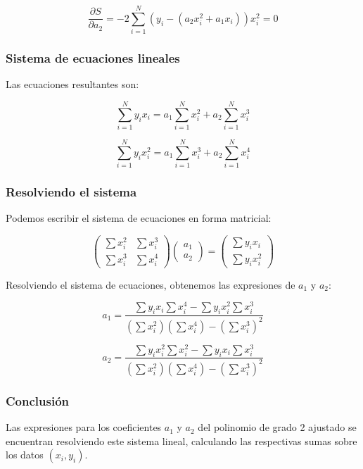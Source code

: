\documentclass{article}
\begin{document}
\[
\frac{\partial S}{\partial a_2} = -2 \sum_{i=1}^N \left( y_i - (a_2x_i^2 + a_1x_i) \right) x_i^2 = 0
\]

\subsubsection*{Sistema de ecuaciones lineales}

Las ecuaciones resultantes son:

\[
\sum_{i=1}^N y_i x_i = a_1 \sum_{i=1}^N x_i^2 + a_2 \sum_{i=1}^N x_i^3
\]

\[
\sum_{i=1}^N y_i x_i^2 = a_1 \sum_{i=1}^N x_i^3 + a_2 \sum_{i=1}^N x_i^4
\]

\subsubsection*{Resolviendo el sistema}

Podemos escribir el sistema de ecuaciones en forma matricial:

\[
\begin{pmatrix}
\sum x_i^2 & \sum x_i^3 \\
\sum x_i^3 & \sum x_i^4
\end{pmatrix}
\begin{pmatrix}
a_1 \\
a_2
\end{pmatrix}
=
\begin{pmatrix}
\sum y_i x_i \\
\sum y_i x_i^2
\end{pmatrix}
\]

Resolviendo el sistema de ecuaciones, obtenemos las expresiones de \(a_1\) y \(a_2\):

\[
a_1 = \frac{\sum y_i x_i \sum x_i^4 - \sum y_i x_i^2 \sum x_i^3}{\left( \sum x_i^2 \right) \left( \sum x_i^4 \right) - \left( \sum x_i^3 \right)^2}
\]

\[
a_2 = \frac{\sum y_i x_i^2 \sum x_i^2 - \sum y_i x_i \sum x_i^3}{\left( \sum x_i^2 \right) \left( \sum x_i^4 \right) - \left( \sum x_i^3 \right)^2}
\]

\subsubsection*{Conclusión}

Las expresiones para los coeficientes \(a_1\) y \(a_2\) del polinomio de grado 2 ajustado se encuentran resolviendo este sistema lineal, calculando las respectivas sumas sobre los datos \((x_i, y_i)\).
\end{document}
